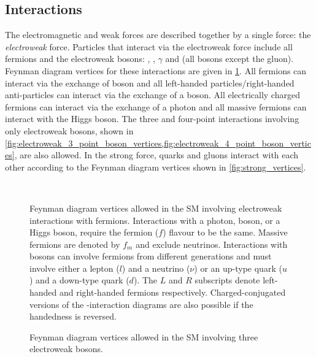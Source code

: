 \subsection{Interactions}
The electromagnetic and weak forces are described together by a single force: the \textit{electroweak} force. Particles that interact via the electroweak force include all fermions and the electroweak bosons: \PZ, \PW, $\gamma$ and \PH (all bosons except the gluon). Feynman diagram vertices for these interactions are given in \cref{fig:electroweak_fermion_vertices}. All fermions can interact via the exchange of \PZ boson and all left-handed particles/right-handed anti-particles can interact via the exchange of a \PW boson. All electrically charged fermions can interact via the exchange of a photon and all massive fermions can interact with the Higgs boson. The three and four-point interactions involving only electroweak bosons, shown in \cref{fig:electroweak_3_point_boson_vertices,fig:electroweak_4_point_boson_vertices}, are also allowed. In the strong force, quarks and gluons interact with each other according to the Feynman diagram vertices shown in \cref{fig:strong_vertices}.

\begin{figure}[b!]
  \centering
   \\
  \caption[Electroweak Feynman Diagram Vertices]{Feynman diagram vertices allowed in the SM involving electroweak interactions with fermions. Interactions with a photon, \PZ boson, or a Higgs boson, require the fermion ($f$) flavour to be the same. Massive fermions are denoted by $f_m$ and exclude neutrinos. Interactions with \PW bosons can involve fermions from different generations and must involve either a lepton ($l$) and a neutrino ($\nu$) or an up-type quark ($u$) and a down-type quark ($d$). The $L$ and $R$ subscripts denote left-handed and right-handed fermions respectively. Charged-conjugated versions of the \PW-interaction diagrams are also possible if the handedness is reversed.}\label{fig:electroweak_fermion_vertices}
\end{figure} 


\begin{figure}
  \centering
  \caption[Three-Point Electroweak Boson Feynman Diagram Vertices]{Feynman diagram vertices allowed in the SM involving three electroweak bosons.}\label{fig:electroweak_3_point_boson_vertices}
\end{figure}

